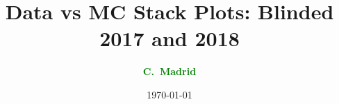 \documentclass[10pt,xcolor=svgnames,fleqn,aspectratio=169]{beamer}
\title{Data vs MC Stack Plots: Blinded 2017 and 2018}
\author{\textcolor{Green}{\bf C.~Madrid\inst{1}}}
\institute{\inst{1} Baylor}
\date{\today}
\begin{document}
\begin{frame}[plain]
\maketitle
\end{frame}





\end{document}
